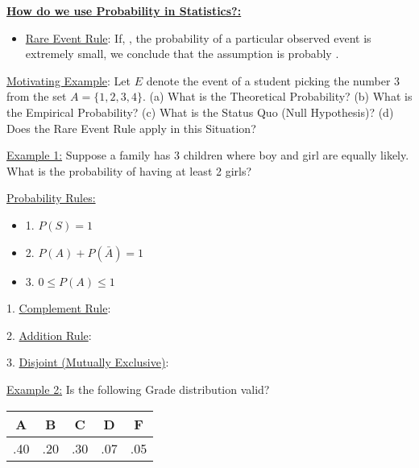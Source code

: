 \documentclass[handout]{ximera}
\newcommand {\bi} {\begin{itemize}}
\newcommand {\ei} {\end{itemize}}
\begin{document}
 \newpage

 \item \underline{\textbf{{\color{blue} How do we use Probability in Statistics?:}}}
   \bi
    \item \underline{Rare Event Rule}: If, \underline{\makebox[3in][c]{ }}, the probability of a particular observed event is extremely small, we conclude that the assumption is probably \underline{\makebox[2in][c]{ }}.
   \ei
  \item[] \underline{Motivating Example}: Let $E$ denote the event of a student picking the number 3 from the set $A = \{1,2,3,4\}$. (a) What is the Theoretical Probability? (b) What is the Empirical Probability? (c) What is the Status Quo (Null Hypothesis)? (d) Does the Rare Event Rule apply in this Situation?

\newpage


 \item[] \underline{Example 1:} Suppose a family has 3 children where boy and girl are equally likely. What is the probability of having at least 2 girls?


  \vspace{3.5in}


 \item \underline{Probability Rules:}

   \bi
    \item[1.] $P(S) = 1$
    \item[2.] $P(A) + P(\bar{A}) = 1$
    \item[3.] $0 \leq P(A) \leq 1$
   \ei

 \item[1.] \underline{Complement Rule}:

    \vspace{1.5in}
    
    \newpage

 \item[2.] \underline{Addition Rule}:

    \vspace{2.75in}

 \item[3.] \underline{Disjoint (Mutually Exclusive)}:

    \vspace{2.75in}

\newpage

 \item[] \underline{Example 2:} Is the following Grade distribution valid?
\begin{center}
 \begin{tabular}{|c c c c c|}
 \hline
 A & B & C & D & F \\
 \hline\hline
 .40 & .20 & .30 & .07 & .05 \\
 \hline
\end{tabular}
\end{center}
\end{document}
